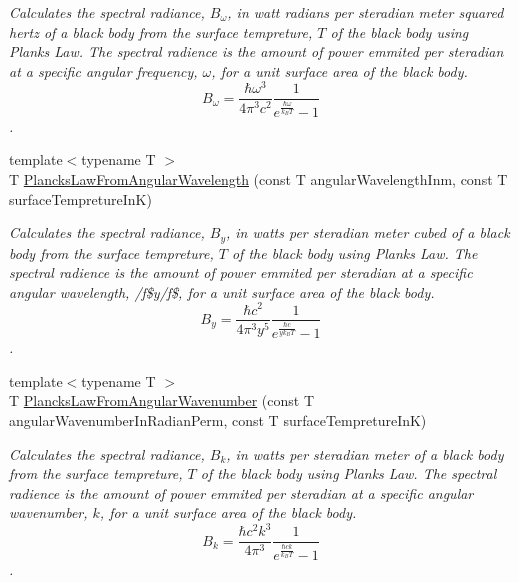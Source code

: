 \begin{DoxyCompactItemize}
\begin{DoxyCompactList}\small\item\em Calculates the spectral radiance, $B_{\omega}$, in watt radians per steradian meter squared hertz of a black body from the surface tempreture, $T$ of the black body using Plank\textquotesingle{}s Law. The spectral radience is the amount of power emmited per steradian at a specific angular frequency, $\omega$, for a unit surface area of the black body. \[ B_{\omega} = \dfrac{\hbar \omega^3}{4\pi^3c^2} \dfrac{1}{e^{\frac{\hbar\omega}{k_B T}} - 1} \]. \end{DoxyCompactList}\item 
{\footnotesize template$<$typename T $>$ }\\T \mbox{\hyperlink{group___e_g_x_phys-_electrodynamics-_black_body-_plancks_law_ga7322124727f968d28807e918c5eeb23f}{Plancks\+Law\+From\+Angular\+Wavelength}} (const T angular\+Wavelength\+Inm, const T surface\+Tempreture\+InK)
\begin{DoxyCompactList}\small\item\em Calculates the spectral radiance, $B_{y}$, in watts per steradian meter cubed of a black body from the surface tempreture, $T$ of the black body using Plank\textquotesingle{}s Law. The spectral radience is the amount of power emmited per steradian at a specific angular wavelength, /f\$y/f\$, for a unit surface area of the black body. \[ B_{y} = \dfrac{\hbar c^2}{4\pi^3y^5} \dfrac{1}{e^{\frac{\hbar c}{y k_B T}} - 1} \]. \end{DoxyCompactList}\item 
{\footnotesize template$<$typename T $>$ }\\T \mbox{\hyperlink{group___e_g_x_phys-_electrodynamics-_black_body-_plancks_law_gaa3d3e0fdb77d25bdd40523f9975de902}{Plancks\+Law\+From\+Angular\+Wavenumber}} (const T angular\+Wavenumber\+In\+Radian\+Perm, const T surface\+Tempreture\+InK)
\begin{DoxyCompactList}\small\item\em Calculates the spectral radiance, $B_{k}$, in watts per steradian meter of a black body from the surface tempreture, $T$ of the black body using Plank\textquotesingle{}s Law. The spectral radience is the amount of power emmited per steradian at a specific angular wavenumber, $k$, for a unit surface area of the black body. \[ B_{k} = \dfrac{\hbar c^2 k^3}{4\pi^3} \dfrac{1}{e^{\frac{\hbar c k}{k_B T}} - 1} \]. \end{DoxyCompactList}\item 

\end{DoxyCompactItemize}
